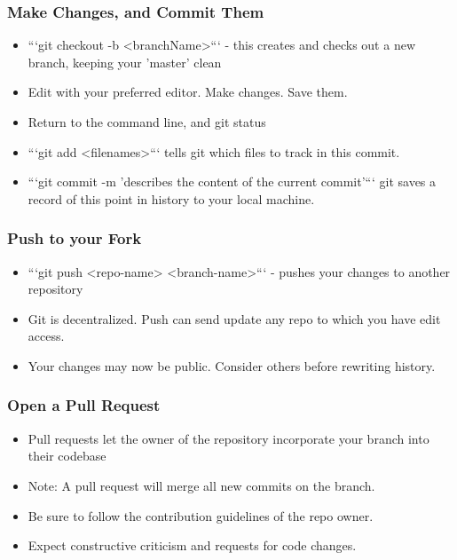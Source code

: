 \documentclass[unknownkeysallowed]{beamer}
\begin{document}
\begin{frame}
    \frametitle{Make Changes, and Commit Them}
    \begin{itemize}
        \item{```git checkout -b <branchName>``` - this creates and checks out a new branch, keeping your 'master' clean}
        \item{Edit with your preferred editor. Make changes. Save them.}
        \item{Return to the command line, and git status}
        \item{```git add <filenames>``` tells git which files to track in this commit.}
        \item{```git commit -m 'describes the content of the current commit'``` git saves a record of this point in history to your local machine.}
    \end{itemize}
    \vspace{1cm} %
\end{frame}

\begin{frame}
    \frametitle{Push to your Fork}
    \begin{itemize}
        \item{```git push <repo-name> <branch-name>``` - pushes your changes to another repository }
        \item{Git is decentralized. Push can send update any repo to which you have edit access.}
        \item{Your changes may now be public. Consider others before rewriting history.}
    \end{itemize}
    \vspace{1cm} %
\end{frame}

\begin{frame}
    \frametitle{Open a Pull Request}
    \begin{itemize}
        \item{Pull requests let the owner of the repository incorporate your branch into their codebase}
        \item{Note: A pull request will merge all new commits on the branch.}
        \item{Be sure to follow the contribution guidelines of the repo owner.}
        \item{Expect constructive criticism and requests for code changes.}
    \end{itemize}
    \vspace{1cm} %
\end{frame}
\end{document}
